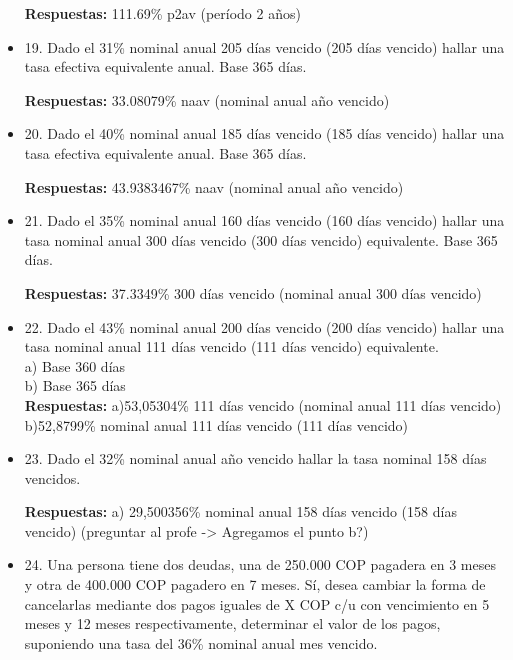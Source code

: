 \begin{itemize}
       \textbf{Respuestas:} 111.69\% p2av (período 2 años)
       \medskip

 \item 19. Dado el 31\% nominal anual 205 días vencido (205 días vencido) hallar una tasa efectiva equivalente anual. Base 365 días.
 
       \textbf{Respuestas:} 33.08079\% naav (nominal anual año vencido)
       \medskip

 \item 20. Dado el 40\% nominal anual 185 días vencido (185 días vencido) hallar una tasa efectiva equivalente anual. Base 365 días.
 
       \textbf{Respuestas:} 43.9383467\% naav (nominal anual año vencido)
       \medskip

 \item 21. Dado el 35\% nominal anual 160 días vencido (160 días vencido) hallar una tasa nominal anual 300 días vencido (300 días vencido) equivalente. Base 365 días.
 
       \textbf{Respuestas:} 37.3349\% 300 días vencido (nominal anual 300 días vencido)
       \medskip

 \item 22. Dado el 43\% nominal anual 200 días vencido (200 días vencido) hallar una tasa nominal anual 111 días vencido (111 días vencido) equivalente.\\

       a) Base 360 días\\
       b) Base 365 días\\

       \textbf{Respuestas:} a)53,05304\% 111 días vencido (nominal anual 111 días vencido)\\
       b)52,8799\% nominal anual 111 días vencido (111 días vencido)
       \medskip

 \item 23. Dado el 32\% nominal anual año vencido hallar la tasa nominal 158 días vencidos.
 
       \textbf{Respuestas:} a) 29,500356\% nominal anual 158 días vencido (158 días vencido)
       (preguntar al profe -> Agregamos el punto b?)
       \medskip

 \item 24. Una persona tiene dos deudas, una de 250.000 COP pagadera en 3 meses y otra de 400.000 COP pagadero en 7 meses. Sí, desea cambiar la forma de cancelarlas mediante dos pagos iguales de X COP c/u con vencimiento en 5 meses y 12 meses respectivamente, determinar el valor de los pagos, suponiendo una tasa del 36\% nominal anual mes vencido.
 

\end{itemize}
